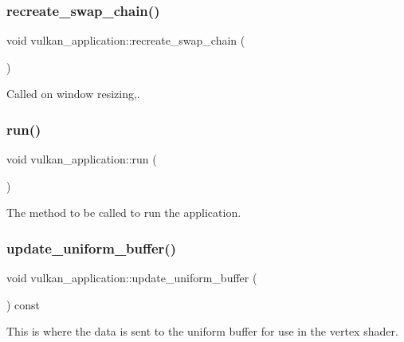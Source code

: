 \subsubsection{\texorpdfstring{recreate\+\_\+swap\+\_\+chain()}{recreate\_swap\_chain()}}
{\footnotesize\ttfamily void vulkan\+\_\+application\+::recreate\+\_\+swap\+\_\+chain (\begin{DoxyParamCaption}{ }\end{DoxyParamCaption})\hspace{0.3cm}{\ttfamily [private]}}



Called on window resizing,. 

\mbox{\label{classvulkan__application_a3f7182376c00ba7af1faa6a04bf2fb47}} 
\subsubsection{\texorpdfstring{run()}{run()}}
{\footnotesize\ttfamily void vulkan\+\_\+application\+::run (\begin{DoxyParamCaption}{ }\end{DoxyParamCaption})}



The method to be called to run the application. 

\mbox{\label{classvulkan__application_a6b685b0b52f3afd01b77f71325aa2ccb}} 
\subsubsection{\texorpdfstring{update\+\_\+uniform\+\_\+buffer()}{update\_uniform\_buffer()}}
{\footnotesize\ttfamily void vulkan\+\_\+application\+::update\+\_\+uniform\+\_\+buffer (\begin{DoxyParamCaption}{ }\end{DoxyParamCaption}) const\hspace{0.3cm}{\ttfamily [private]}}



This is where the data is sent to the uniform buffer for use in the vertex shader. 



